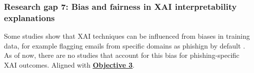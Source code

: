 
\subsubsection*{Research gap 7: Bias and fairness in XAI interpretability explanations}\label{research-gap-7}
Some studies show that XAI techniques can be influenced from biases in training data, for example flagging emails from specific domains as phishign by default \citep{hanif2021survey}. As of now, there are no studies that account for this bias for phishing-specific XAI outcomes. Aligned with \hyperref[objective-3]{\uline{\textbf{Objective 3}}}.
